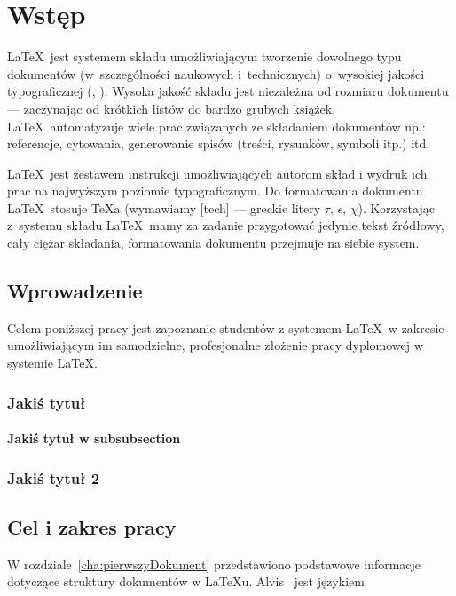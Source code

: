 \chapter{Wstęp}\label{cha:wstep}

\LaTeX~jest systemem składu umożliwiającym tworzenie dowolnego typu dokumentów (w~szczególności naukowych i~technicznych) o~wysokiej jakości typograficznej (\cite{Dil00}, \cite{Lam92}). Wysoka jakość składu jest niezależna od rozmiaru dokumentu --- zaczynając od krótkich listów do bardzo grubych książek. \LaTeX~automatyzuje wiele prac związanych ze składaniem dokumentów np.: referencje, cytowania, generowanie spisów (treści, rysunków, symboli itp.) itd.

\LaTeX~jest zestawem instrukcji umożliwiających autorom skład i wydruk ich prac na najwyższym poziomie typograficznym. Do formatowania dokumentu \LaTeX~stosuje \TeX{}a (wymawiamy [tech] --- greckie litery $\tau$, $\epsilon$, $\chi$). Korzystając z~systemu składu \LaTeX~mamy za zadanie przygotować jedynie tekst źródłowy, cały ciężar składania, formatowania dokumentu przejmuje na siebie system.


\section{Wprowadzenie}\label{sec:wprowadzenie}


Celem poniższej pracy jest zapoznanie studentów z systemem \LaTeX~w zakresie umożliwiającym im samodzielne, profesjonalne złożenie pracy dyplomowej w systemie \LaTeX.

\subsection{Jakiś tytuł}

\subsubsection{Jakiś tytuł w subsubsection}


\subsection{Jakiś tytuł 2}


\section{Cel i zakres pracy}\label{sec:celizakres}

W rozdziale~\ref{cha:pierwszyDokument} przedstawiono podstawowe informacje dotyczące struktury dokumentów w \LaTeX{}u. Alvis~\cite{Alvis2011} jest językiem 


















